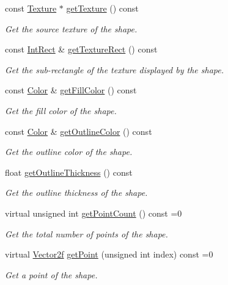 \begin{DoxyCompactItemize}
const \hyperlink{classsf_1_1Texture}{Texture} $\ast$ \hyperlink{classsf_1_1Shape_a1bf27ac425fcce36efd0eed67531a403}{get\-Texture} () const 
\begin{DoxyCompactList}\small\item\em Get the source texture of the shape. \end{DoxyCompactList}\item 
const \hyperlink{classsf_1_1Rect}{Int\-Rect} \& \hyperlink{classsf_1_1Shape_af7c4c80a435b85a622812711cf510439}{get\-Texture\-Rect} () const 
\begin{DoxyCompactList}\small\item\em Get the sub-\/rectangle of the texture displayed by the shape. \end{DoxyCompactList}\item 
const \hyperlink{classsf_1_1Color}{Color} \& \hyperlink{classsf_1_1Shape_ad7f7fe601a8bb24efe9aa77809a35c12}{get\-Fill\-Color} () const 
\begin{DoxyCompactList}\small\item\em Get the fill color of the shape. \end{DoxyCompactList}\item 
const \hyperlink{classsf_1_1Color}{Color} \& \hyperlink{classsf_1_1Shape_a4fa7d3bf5ee2332f6b9d9bebe9b1e2fd}{get\-Outline\-Color} () const 
\begin{DoxyCompactList}\small\item\em Get the outline color of the shape. \end{DoxyCompactList}\item 
float \hyperlink{classsf_1_1Shape_ac66f917b41eda6159a8ba6571d77f2ad}{get\-Outline\-Thickness} () const 
\begin{DoxyCompactList}\small\item\em Get the outline thickness of the shape. \end{DoxyCompactList}\item 
virtual unsigned int \hyperlink{classsf_1_1Shape_ad84e1b675ecd270ad8151aea4e271a78}{get\-Point\-Count} () const =0
\begin{DoxyCompactList}\small\item\em Get the total number of points of the shape. \end{DoxyCompactList}\item 
virtual \hyperlink{classsf_1_1Vector2}{Vector2f} \hyperlink{classsf_1_1Shape_a397f3b4cdb7ad98cdc6c034816c652d2}{get\-Point} (unsigned int index) const =0
\begin{DoxyCompactList}\small\item\em Get a point of the shape. \end{DoxyCompactList}\item 

\end{DoxyCompactItemize}
